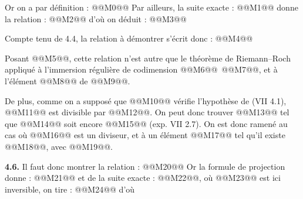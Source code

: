 
Or on a par
définition :
@@M0@@
Par ailleurs, la suite exacte :
@@M1@@
donne la relation :
@@M2@@
d'où on déduit :
@@M3@@

Compte tenu de 4.4, la relation à démontrer s'écrit donc :
@@M4@@

Posant @@M5@@, cette relation n'est autre que le théorème de Riemann--Roch appliqué à l'immersion régulière de codimension @@M6@@~@@M7@@, et à l'élément @@M8@@ de @@M9@@.

De plus, comme on a supposé que @@M10@@ vérifie l'hypothèse de (VII 4.1), @@M11@@ est divisible par @@M12@@. On peut donc trouver @@M13@@ tel que @@M14@@ soit encore @@M15@@ (exp. VII 2.7). On est donc ramené au cas où @@M16@@ est un diviseur, et à un élément @@M17@@ tel qu'il existe @@M18@@, avec @@M19@@.

\textbf{4.6.} Il faut donc montrer la relation :
@@M20@@
Or la formule de projection donne :
@@M21@@
et de la suite exacte : @@M22@@, où @@M23@@ est ici inversible, on tire :
@@M24@@
d'où
